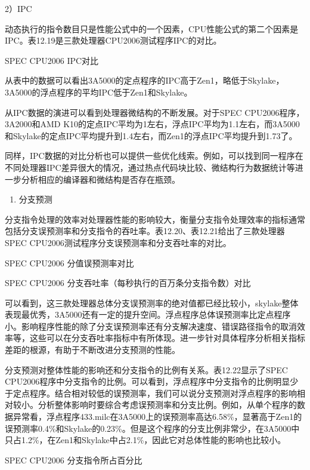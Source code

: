 \documentclass[]{ctexbook}
\providecommand{\tightlist}{%
  \setlength{\itemsep}{0pt}\setlength{\parskip}{0pt}}
\begin{document}
2）IPC

动态执行的指令数目只是性能公式中的一个因素，CPU性能公式的第二个因素是IPC。表12.19是三款处理器CPU2006测试程序IPC的对比。

\label{tab:2006ipc}SPEC CPU2006 IPC对比

从表中的数据可以看出3A5000的定点程序的IPC高于Zen1，略低于Skylake，3A5000的浮点程序的平均IPC低于Zen1和Skylake。

从IPC数据的演进可以看到处理器微结构的不断发展。对于SPEC CPU2006程序，3A2000和AMD K10的定点IPC平均为1左右，浮点IPC平均为1.1左右，而3A5000和Skylake的定点IPC平均提升到1.4左右，而Zen1的浮点IPC平均提升到1.73了。

同样，IPC数据的对比分析也可以提供一些优化线索。例如，可以找到同一程序在不同处理器IPC差异很大的情况，通过热点代码块比较、微结构行为数据统计等进一步分析相应的编译器和微结构是否存在瓶颈。

\begin{enumerate}
\def\labelenumi{\arabic{enumi})}
\setcounter{enumi}{2}
\tightlist
\item
  分支预测
\end{enumerate}

分支指令处理的效率对处理器性能的影响较大，衡量分支指令处理效率的指标通常包括分支误预测率和分支指令的吞吐率。表12.20、表12.21给出了三款处理器SPEC CPU2006测试程序分支误预测率和分支吞吐率的对比。

\label{tab:2006brpred}SPEC CPU2006 分值误预测率对比

\label{tab:2006brbandwidth}SPEC CPU2006 分支吞吐率（每秒执行的百万条分支指令数）对比

可以看到，这三款处理器总体分支误预测率的绝对值都已经比较小，skylake整体表现最优秀，3A5000还有一定的提升空间。浮点程序总体误预测率比定点程序小。影响程序性能的除了分支误预测率还有分支解决速度、错误路径指令的取消效率等，这些可以在分支吞吐率指标中有所体现。进一步针对具体程序分析相关指标差距的根源，有助于不断改进分支预测的性能。

分支预测对整体性能的影响还和分支指令的比例有关系。表12.22显示了SPEC CPU2006程序中分支指令的比例。可以看到，浮点程序中分支指令的比例明显少于定点程序。结合相对较低的误预测率，我们可以说分支预测对浮点程序的影响相对较小。分析整体影响时要综合考虑误预测率和分支比例。例如，从单个程序的数据异常看，浮点程序433.milc在3A5000上的误预测率高达6.58\%，显著高于Zen1的误预测率0.4\%和Skylake的0.23\%。但是这个程序的分支比例非常少，在3A5000中只占1.2\%，在Zen1和Skylake中占2.1\%，因此它对总体性能的影响也比较小。

\label{tab:2006brpercent}SPEC CPU2006 分支指令所占百分比
\end{document}
